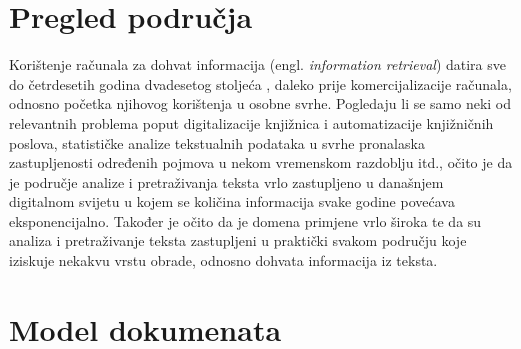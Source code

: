 \documentclass[times, utf8, zavrsni, numeric]{fer}
\begin{document}
\chapter{Pregled područja}
\label{chap:overview}
Korištenje računala za dohvat informacija (engl. \textit{information retrieval}) datira sve do četrdesetih godina dvadesetog stoljeća \cite{sanderson2012history}, daleko prije komercijalizacije računala, odnosno početka njihovog korištenja u osobne svrhe. Pogledaju li se samo neki od relevantnih problema poput digitalizacije knjižnica i automatizacije knjižničnih poslova, statističke analize tekstualnih podataka u svrhe pronalaska zastupljenosti određenih pojmova u nekom vremenskom razdoblju itd., očito je da je područje analize i pretraživanja teksta vrlo zastupljeno u današnjem digitalnom svijetu u kojem se količina informacija svake godine povećava eksponencijalno. Također je očito da je domena primjene vrlo široka te da su analiza i pretraživanje teksta zastupljeni u praktički svakom području koje iziskuje nekakvu vrstu obrade, odnosno dohvata informacija iz teksta.

\chapter{Model dokumenata}
\label{docmodel}
\end{document}
